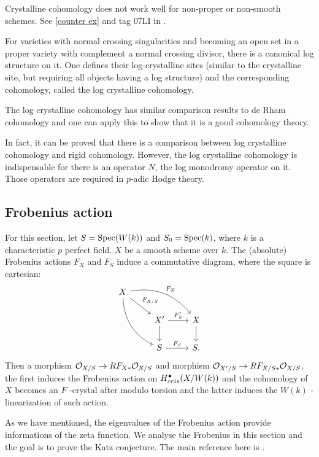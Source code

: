 \begin{remark}
    Crystalline cohomology does not work well for non-proper or non-smooth schemes. 
    See \ref{counter ex} and tag 07LI in \cite{Sta}.
\end{remark}

\begin{remark}
    For varieties with normal crossing singularities and 
    becoming an open set in a proper variety 
    with complement a normal crossing divisor, 
    there is a canonical log structure on it. 
    One defines their log-crystalline sites 
    (similar to the crystalline site, but requiring all objects having a log structure) 
    and the corresponding cohomology, called the log crystalline cohomology. 
    
    The log crystalline cohomology has similar comparison results to de Rham cohomology 
    and one can apply this to show that it is a good cohomology theory.

    In fact, it can be proved that 
    there is a comparison between log crystalline cohomology and rigid cohomology. 
    However, the log crystalline cohomology is indispensable for there is an operator $N$, 
    the log monodromy operator on it. 
    Those operators are required in $p$-adic Hodge theory.
\end{remark}

\subsection{Frobenius action}
For this section, let $S = \operatorname{Spec} (W(k))$ and $S_0 = \operatorname{Spec} (k)$, 
where $k$ is a characteristic $p$ perfect field. 
$X$ be a smooth scheme over $k$. 
The (absolute) Frobenius actions $F_X$ and $F_S$ induce a commutative diagram, 
where the square is cartesian:
\[
    \begin{tikzcd}
        X \ar[ddr, bend right] \ar[dr, "{F_{X/S}}"] \ar[drr, "F_X", bend left] \\
        & X'\ar[r, "{F_S'}"] \ar[d] & X \ar[d]\\
        & S \ar[r, "{F_S}"] & S.
    \end{tikzcd}
\]
Then a morphism ${\mathcal {O}}_{X/S} \to RF_{X*} {\mathcal {O}}_{X/S}$ 
and morphism ${\mathcal {O}}_{X'/S} \to RF_{X/S*} {\mathcal {O}}_{X/S}$, 
the first induces the Frobenius action on $H^\bullet_{cris}(X/W(k))$ and the cohomology of $X$ 
becomes an $F$ -crystal after modulo torsion 
and the latter induces the $W(k)$ -linearization of such action.

As we have mentioned, the eigenvalues of the Frobenius action 
provide informations of the zeta function. 
We analyse the Frobenius in this section and the goal is to prove the Katz conjecture. 
The main reference here is \cite{BO}.

